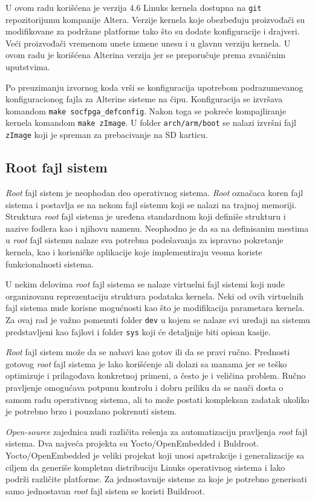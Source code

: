 U ovom radu korišćena je verzija 4.6 Linuks kernela dostupna na \texttt{git} repozitorijumu kompanije Altera. Verzije kernela koje obezbeđuju proizvođači su modifikovane za podržane platforme tako što su dodate konfiguracije i drajveri. Veći proizvođači vremenom unete izmene unesu i u glavnu verziju kernela. U ovom radu je korišćena Alterina verzija jer se preporučuje prema zvaničnim uputstvima.

Po preuzimanju izvornog koda vrši se konfiguracija upotrebom podrazumevanog konfiguracionog fajla za Alterine sisteme na čipu. Konfiguracija se izvršava komandom \texttt{make socfpga\_defconfig}. Nakon toga se pokreće kompajliranje kernela komandom \texttt{make zImage}. U folder \texttt{arch/arm/boot} se nalazi izvršni fajl \texttt{zImage} koji je spreman za prebacivanje na SD karticu.
\subsection{Root fajl sistem}
\textit{Root} fajl sistem je neophodan deo operativnog sistema. \textit{Root} označaca koren fajl sistema i postavlja se na nekom fajl sistemu koji se nalazi na trajnoj memoriji. Struktura \textit{root} fajl sistema je uređena standardnom \cite{fhs} koji definiše strukturu i nazive fodlera kao i njihovu namenu. Neophodno je da sa na definisanim mestima u \textit{root} fajl sistemu nalaze sva potrebna podešavanja za ispravno pokretanje kernela, kao i korisničke aplikacije koje implementiraju veoma koriste funkcionalnosti sistema.

U nekim delovima \textit{root} fajl sistema se nalaze virtuelni fajl sistemi koji nude organizovanu reprezentaciju struktura podataka kernela. Neki od ovih virtuelnih fajl sistema nude korisne mogućnosti kao što je modifikacija parametara kernela. Za ovaj rad je važno pomenuti folder \texttt{dev} u kojem se nalaze svi uređaji na sistemu predstavljeni kao fajlovi i folder \texttt{sys} koji će detaljnije biti opisan kasije.

\textit{Root} fajl sistem može da se nabavi kao gotov ili da se pravi ručno. Prednosti gotovog \textit{root} fajl sistema je lako korišćenje ali dolazi sa manama jer se teško optimizuje i prilagođava konkretnoj primeni, a često je i veličina problem. Ručno pravljenje omogućava potpunu kontrolu i dobru priliku da se nauči dosta o samom radu operativnog sistema, ali to može postati kompleksan zadatak ukoliko je potrebno brzo i pouzdano pokrenuti sistem.

\textit{Open-source} zajednica nudi različita rešenja za automatizaciju pravljenja \textit{root} fajl sistema. Dva najveća projekta su Yocto/OpenEmbedded i Buldroot. Yocto/OpenEmbedded je veliki projekat koji unosi apstrakcije i generalizacije sa ciljem da generiše kompletnu distribuciju Linuks operativnog sistema i lako podrži različite platforme. Za jednostavnije sisteme za koje je potrebno generisati samo jednostavan \textit{root} fajl sistem se koristi Buildroot.


